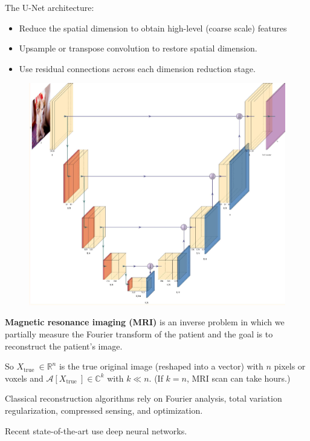 \documentclass{report}
\begin{document}
\begin{definition}[8.25][U-Net]
    The U-Net architecture:

    \begin{itemize}
        \item Reduce the spatial dimension to obtain high-level (coarse scale) features
        \item Upsample or transpose convolution to restore spatial dimension.
        \item Use residual connections across each dimension reduction stage.
    \end{itemize}

    \begin{figure}[H]
        \centering
        \includegraphics[width=1.0\textwidth]{.././assets/8.25.jpg}
    \end{figure}
\end{definition}

\begin{definition}
    \textbf{Magnetic resonance imaging (MRI)} is an inverse problem in which we partially measure the Fourier transform of the patient and the goal is to reconstruct the patient's image.

    So $X_{\text {true }} \in \mathbb{R}^{n}$ is the true original image (reshaped into a vector) with $n$ pixels or voxels and $\mathcal{A}\left[X_{\text {true }}\right] \in \mathbb{C}^{k}$ with $k \ll n$. (If $k=n$, MRI scan can take hours.)

    Classical reconstruction algorithms rely on Fourier analysis, total variation regularization, compressed sensing, and optimization.

    Recent state-of-the-art use deep neural networks.
\end{definition}
\end{document}
